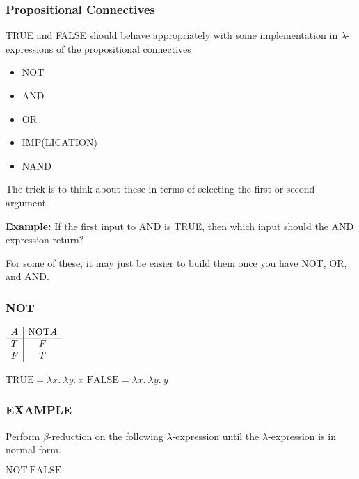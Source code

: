 \documentclass{beamer}
\begin{document}
\begin{frame}
	\frametitle{Propositional Connectives}

	TRUE and FALSE should behave appropriately with some implementation in $\lambda$-expressions of the propositional connectives 
	
	\begin{itemize}
		\item[] NOT 
		\item[] AND 
		\item[] OR 
		\item[] IMP(LICATION)
		\item[] NAND 
	\end{itemize}

	The trick is to think about these in terms of selecting the first or second argument. 
	
	\vspace{0.3cm}

	{\bf Example:} If the first input to AND is TRUE, then which input should the AND expression return? 

	\vspace{0.3cm}
	
	For some of these, it may just be easier to build them once you have NOT, OR, and AND.

\end{frame}

\begin{frame}
	\frametitle{NOT}

	\begin{center}
		$\begin{array}{ l | c }			
			A &  \text{NOT} A\\
			\cline{1 - 2}
			T &  F \\ 
			F &  T
		\end{array}$
	\end{center}

	$\text{TRUE} = \lambda x. \ \lambda y. \ x$ \hspace{4cm} $\text{FALSE} = \lambda x. \ \lambda y. \ y$

	\vspace{5cm}

\end{frame}

\begin{frame}
	\frametitle{EXAMPLE}

	Perform $\beta$-reduction on the following $\lambda$-expression until the $\lambda$-expression is in normal form.
	
	\vspace{0.5cm}

	$\text{NOT} \ \text{FALSE}$

	\vspace{5cm}

\end{frame}
\end{document}
